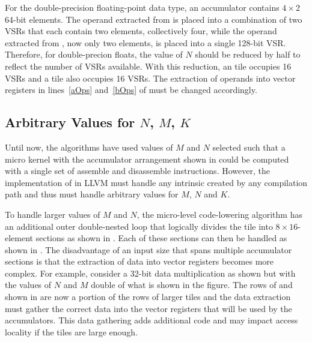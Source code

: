 \documentclass[\main/thesis.tex]{subfiles}
\begin{document}
For the double-precision floating-point data type, an accumulator contains $4 \times 2$ 64-bit elements.
The operand extracted from  is placed into a combination of two VSRs that each contain two elements, collectively four, while the operand extracted from , now only two elements, is placed into a single 128-bit VSR.
Therefore, for double-precion floats, the value of $N$ should be reduced by half to reflect the number of VSRs available.
With this reduction, an  tile occupies 16 VSRs and a  tile also occupies 16 VSRs.
The extraction of operands into vector registers in lines~\ref{aOps} and~\ref{bOps} of  must be changed accordingly.

\subsection{Arbitrary Values for $N$, $M$, $K$}
\label{sec:arbitraryDims}
Until now, the algorithms have used values of $M$ and $N$ selected such that a micro kernel with the accumulator arrangement shown in  could be computed with a single set of assemble and disassemble instructions.
However, the implementation of  in LLVM must handle any  intrinsic created by any compilation path and thus must handle arbitrary values for $M$, $N$ and $K$.

To handle larger values of $M$ and $N$, the micro-level code-lowering algorithm has an additional outer double-nested loop that logically divides the  tile into $8 \times 16$-element sections as shown in .
Each of these sections can then be handled as shown in .
The disadvantage of an input size that spans multiple accumulator sections is that the extraction of data into vector registers becomes more complex.
For example, consider a 32-bit data multiplication as shown  but with the values of $N$ and $M$ double of what is shown in the figure.
The rows of  and  shown in  are now a portion of the rows of larger tiles and the data extraction must gather the correct data into the vector registers that will be used by the accumulators.
This data gathering adds additional code and may impact access locality if the tiles are large enough.
\end{document}

